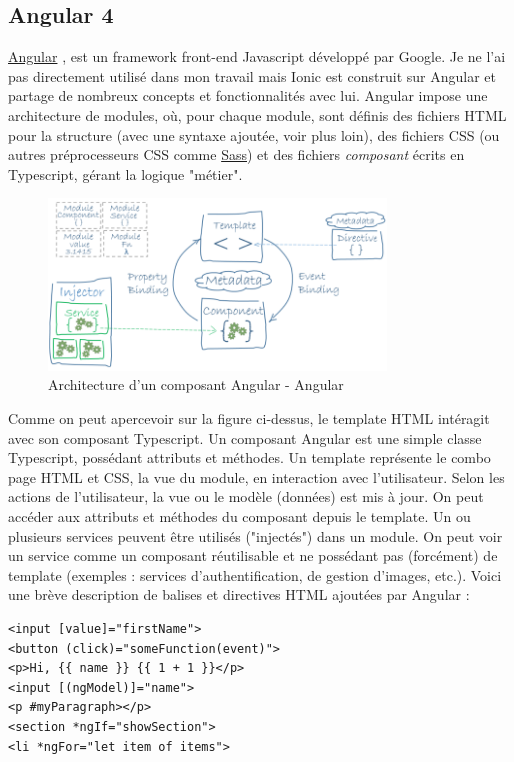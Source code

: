 \documentclass[a4paper, 12pt]{article}
\newenvironment{code}{\captionsetup{type=listing}}{}
\begin{document}
\subsection{Angular 4}
\href{https://angular.io/}{Angular} \cite{ref15}, \cite{ref21} est un framework front-end Javascript développé par Google.
Je ne l'ai pas directement utilisé dans mon travail mais Ionic est construit sur Angular et partage de nombreux concepts
et fonctionnalités avec lui.
Angular impose une architecture de modules, où, pour chaque module, sont définis des fichiers HTML pour la structure
(avec une syntaxe ajoutée, voir plus loin), des fichiers CSS (ou autres préprocesseurs CSS comme
\href{http://sass-lang.com/}{Sass}) et des fichiers \textit{composant} écrits en Typescript, gérant la logique "métier".
\begin{figure}
    \begin{center}
        \includegraphics[width=0.8\textwidth]{images/angular2.png}
    \end{center}
    \caption{Architecture d'un composant Angular - Angular \cite{ref13}}
\end{figure}
Comme on peut apercevoir sur la figure ci-dessus, le template HTML intéragit avec son composant Typescript.
Un composant Angular est une simple classe Typescript, possédant attributs et méthodes.
Un template représente le combo page HTML et CSS, la vue du module, en interaction avec l'utilisateur.
Selon les actions de l'utilisateur, la vue ou le modèle (données) est mis à jour. On peut accéder aux attributs et méthodes
du composant depuis le template. Un ou plusieurs services peuvent être utilisés ("injectés") dans un module. On peut
voir un service comme un composant réutilisable et ne possédant pas (forcément) de template (exemples : services
d'authentification, de gestion d'images, etc.).
\bigbreak
Voici une brève description de balises et directives HTML ajoutées par Angular :
\begin{code}
    \begin{verbatim}
<input [value]="firstName">
<button (click)="someFunction(event)">
<p>Hi, {{ name }} {{ 1 + 1 }}</p>
<input [(ngModel)]="name">
<p #myParagraph></p>
<section *ngIf="showSection">
<li *ngFor="let item of items">
    \end{verbatim}
    \caption{Syntaxe HTML avec Angular}
\end{code}
\end{document}
